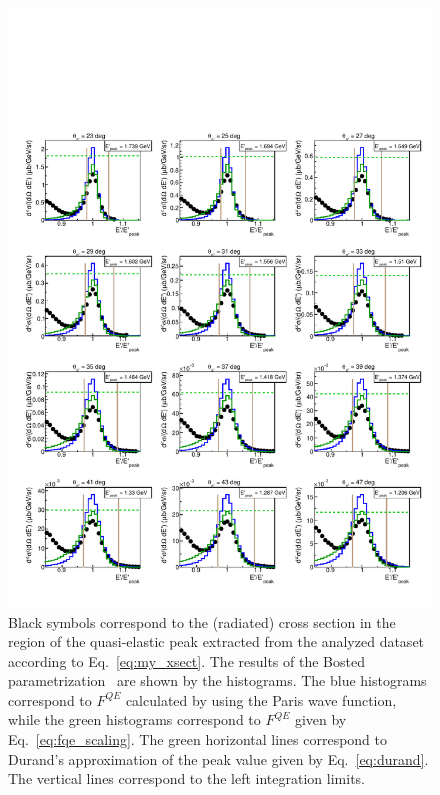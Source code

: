 \afterpage{\clearpage}
\begin{figure}[htp]
\begin{center}
\includegraphics[width=\textwidth]{pictures/normalization/my_xsect_pdf.pdf}
\caption{\small Black symbols correspond to the (radiated) cross section in the region of the quasi-elastic peak extracted from the analyzed dataset according to Eq.~\eqref{eq:my_xsect}. The results of the Bosted parametrization~\cite{Bosted_fit,Bosted:2007xd} are shown by the histograms. The blue histograms correspond to $F^{QE}$ calculated by using the Paris wave function, while the green histograms correspond to $F^{QE}$ given by Eq.~\eqref{eq:fqe_scaling}. The green horizontal lines correspond to Durand's approximation of the peak value given by Eq.~\eqref{eq:durand}. The vertical lines correspond to the left integration limits. } \label{fig:my_QE}
\end{center}
\end{figure}

